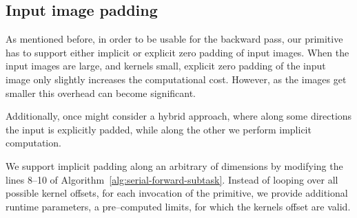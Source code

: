   \subsection{Input image padding}

  As mentioned before, in order to be usable for the backward pass,
  our primitive has to support either implicit or explicit zero
  padding of input images.  When the input images are large, and
  kernels small, explicit zero padding of the input image only
  slightly increases the computational cost.  However, as the images
  get smaller this overhead can become significant.

  Additionally, once might consider a hybrid approach, where along
  some directions the input is explicitly padded, while along the
  other we perform implicit computation.

  We support implicit padding along an arbitrary of dimensions by
  modifying the lines 8--10 of
  Algorithm~\ref{alg:serial-forward-subtask}.  Instead of looping over
  all possible kernel offsets, for each invocation of the primitive,
  we provide additional runtime parameters, a pre--computed limits,
  for which the kernels offset are valid.
